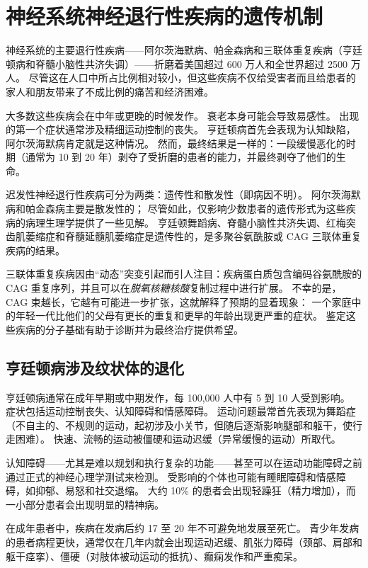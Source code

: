 \chapter{神经系统神经退行性疾病的遗传机制} \label{chap:chap63}

神经系统的主要退行性疾病——阿尔茨海默病、帕金森病和三联体重复疾病（亨廷顿病和脊髓小脑性共济失调）——折磨着美国超过 600 万人和全世界超过 2500 万人。
尽管这在人口中所占比例相对较小，但这些疾病不仅给受害者而且给患者的家人和朋友带来了不成比例的痛苦和经济困难。


大多数这些疾病会在中年或更晚的时候发作。
衰老本身可能会导致易感性。
出现的第一个症状通常涉及精细运动控制的丧失。
亨廷顿病首先会表现为认知缺陷，阿尔茨海默病肯定就是这种情况。
然而，最终结果是一样的：一段缓慢恶化的时期（通常为 10 到 20 年）剥夺了受折磨的患者的能力，并最终剥夺了他们的生命。


迟发性神经退行性疾病可分为两类：遗传性和散发性（即病因不明）。
阿尔茨海默病和帕金森病主要是散发性的；
尽管如此，仅影响少数患者的遗传形式为这些疾病的病理生理学提供了一些见解。
亨廷顿舞蹈病、脊髓小脑性共济失调、红梅突齿肌萎缩症和脊髓延髓肌萎缩症是遗传性的，是多聚谷氨酰胺或 CAG 三联体重复疾病的结果。


三联体重复疾病因由“动态”突变引起而引人注目：疾病蛋白质包含编码谷氨酰胺的 CAG 重复序列，并且可以在\textit{脱氧核糖核酸}复制过程中进行扩展。
不幸的是，CAG 束越长，它越有可能进一步扩张，这就解释了预期的显着现象：
一个家庭中的年轻一代比他们的父母有更长的重复和更早的年龄出现更严重的症状。
鉴定这些疾病的分子基础有助于诊断并为最终治疗提供希望。



\section{亨廷顿病涉及纹状体的退化}

亨廷顿病通常在成年早期或中期发作，每 100,000 人中有 5 到 10 人受到影响。
症状包括运动控制丧失、认知障碍和情感障碍。
运动问题最常首先表现为舞蹈症（不自主的、不规则的运动，起初涉及小关节，但随后逐渐影响腿部和躯干，使行走困难）。
快速、流畅的运动被僵硬和运动迟缓（异常缓慢的运动）所取代。


认知障碍——尤其是难以规划和执行复杂的功能——甚至可以在运动功能障碍之前通过正式的神经心理学测试来检测。
受影响的个体也可能有睡眠障碍和情感障碍，如抑郁、易怒和社交退缩。
大约 10\% 的患者会出现轻躁狂（精力增加），而一小部分患者会出现明显的精神病。


在成年患者中，疾病在发病后约 17 至 20 年不可避免地发展至死亡。
青少年发病的患者病程更快，通常仅在几年内就会出现运动迟缓、肌张力障碍（颈部、肩部和躯干痉挛）、僵硬（对肢体被动运动的抵抗）、癫痫发作和严重痴呆。



